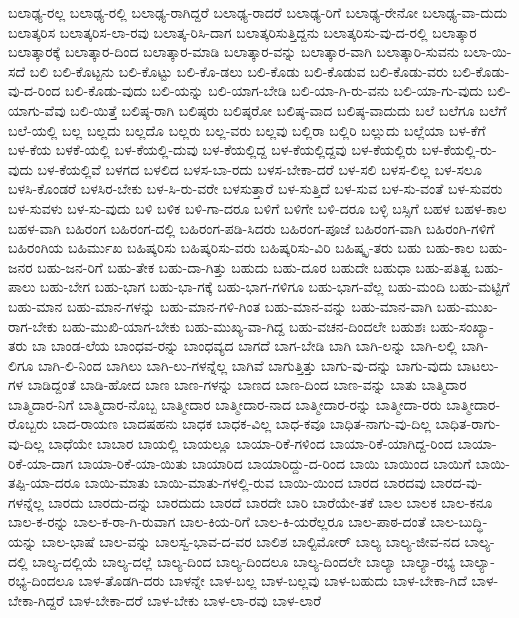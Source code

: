{ಬಲಾಢ್ಯ-ರಲ್ಲ
ಬಲಾಢ್ಯ-ರಲ್ಲಿ
ಬಲಾಢ್ಯ-ರಾಗಿದ್ದರೆ
ಬಲಾಢ್ಯ-ರಾದರೆ
ಬಲಾಢ್ಯ-ರಿಗೆ
ಬಲಾಢ್ಯ-ರೇನೋ
ಬಲಾಢ್ಯ-ವಾ-ದುದು
ಬಲಾತ್ಕರಿಸ
ಬಲಾತ್ಕರಿಸ-ಲಾ-ರವು
ಬಲಾತ್ಕ-ರಿಸಿ-ದಾಗ
ಬಲಾತ್ಕರಿಸುತ್ತಿದ್ದನು
ಬಲಾತ್ಕರಿಸು-ವು-ದ-ರಲ್ಲಿ
ಬಲಾತ್ಕಾರ
ಬಲಾತ್ಕಾರಕ್ಕೆ
ಬಲಾತ್ಕಾರ-ದಿಂದ
ಬಲಾತ್ಕಾರ-ಮಾಡಿ
ಬಲಾತ್ಕಾರ-ವನ್ನು
ಬಲಾತ್ಕಾರ-ವಾಗಿ
ಬಲಾತ್ಕಾರಿ-ಸುವನು
ಬಲಾ-ಯಿ-ಸದೆ
ಬಲಿ
ಬಲಿ-ಕೊಟ್ಟನು
ಬಲಿ-ಕೊಟ್ಟು
ಬಲಿ-ಕೊ-ಡಲು
ಬಲಿ-ಕೊಡು
ಬಲಿ-ಕೊಡುವ
ಬಲಿ-ಕೊಡು-ವರು
ಬಲಿ-ಕೊಡು-ವು-ದ-ರಿಂದ
ಬಲಿ-ಕೊಡು-ವುದು
ಬಲಿ-ಯನ್ನು
ಬಲಿ-ಯಾಗ-ಬೇಡಿ
ಬಲಿ-ಯಾ-ಗಿ-ರು-ವನು
ಬಲಿ-ಯಾ-ಗು-ವುದು
ಬಲಿ-ಯಾಗು-ವೆವು
ಬಲಿ-ಯಿತ್ತೆ
ಬಲಿಷ್ಠ-ರಾಗಿ
ಬಲಿಷ್ಠರು
ಬಲಿಷ್ಠರೋ
ಬಲಿಷ್ಠ-ವಾದ
ಬಲಿಷ್ಠ-ವಾದುದು
ಬಲೆ
ಬಲೆಗೂ
ಬಲೆಗೆ
ಬಲೆ-ಯಲ್ಲಿ
ಬಲ್ಲ
ಬಲ್ಲದು
ಬಲ್ಲದೊ
ಬಲ್ಲರು
ಬಲ್ಲ-ವರು
ಬಲ್ಲವು
ಬಲ್ಲಿರಾ
ಬಲ್ಲಿರಿ
ಬಲ್ಲುದು
ಬಲ್ಲೆಯಾ
ಬಳ-ಕೆಗೆ
ಬಳ-ಕೆಯ
ಬಳಕೆ-ಯಲ್ಲಿ
ಬಳ-ಕೆಯಲ್ಲಿ-ದುವು
ಬಳ-ಕೆಯಲ್ಲಿದ್ದ
ಬಳ-ಕೆಯಲ್ಲಿದ್ದವು
ಬಳ-ಕೆಯಲ್ಲಿರು
ಬಳ-ಕೆಯಲ್ಲಿ-ರು-ವುದು
ಬಳ-ಕೆಯಲ್ಲಿವೆ
ಬಳಗದ
ಬಳಲಿದ
ಬಳಸ-ಬಾ-ರದು
ಬಳಸ-ಬೇಕಾ-ದರೆ
ಬಳ-ಸಲಿ
ಬಳಸ-ಲಿಲ್ಲ
ಬಳ-ಸಲೂ
ಬಳಸಿ-ಕೊಂಡರೆ
ಬಳಸಿರ-ಬೇಕು
ಬಳ-ಸಿ-ರು-ವರೇ
ಬಳಸುತ್ತಾರೆ
ಬಳ-ಸುತ್ತಿದೆ
ಬಳ-ಸುವ
ಬಳ-ಸು-ವಂತೆ
ಬಳ-ಸುವರು
ಬಳ-ಸುವಳು
ಬಳ-ಸು-ವುದು
ಬಳಿ
ಬಳಿಕ
ಬಳಿ-ಗಾ-ದರೂ
ಬಳಿಗೆ
ಬಳಿಗೇ
ಬಳಿ-ದರೂ
ಬಳ್ಳಿ
ಬಸ್ಸಿಗೆ
ಬಹಳ
ಬಹಳ-ಕಾಲ
ಬಹಳ-ವಾಗಿ
ಬಹಿರಂಗ
ಬಹಿರಂಗ-ದಲ್ಲಿ
ಬಹಿರಂಗ-ಪಡಿ-ಸಿದರು
ಬಹಿರಂಗ-ಪೂಜೆ
ಬಹಿರಂಗ-ವಾಗಿ
ಬಹಿರಂಗಿ-ಗಳಿಗೆ
ಬಹಿರಂಗಿಯ
ಬಹಿರ್ಮುಖ
ಬಹಿಷ್ಕರಿಸು
ಬಹಿಷ್ಕರಿಸು-ವರು
ಬಹಿಷ್ಕರಿಸು-ವಿರಿ
ಬಹಿಷ್ಕೃ-ತರು
ಬಹು
ಬಹು-ಕಾಲ
ಬಹು-ಜನರ
ಬಹು-ಜನ-ರಿಗೆ
ಬಹು-ತೇಕ
ಬಹು-ದಾ-ಗಿತ್ತು
ಬಹುದು
ಬಹು-ದೂರ
ಬಹುದೇ
ಬಹುಧಾ
ಬಹು-ಪತಿತ್ವ
ಬಹು-ಪಾಲು
ಬಹು-ಬೇಗ
ಬಹು-ಭಾಗ
ಬಹು-ಭಾ-ಗಕ್ಕೆ
ಬಹು-ಭಾಗ-ಗಳಿಗೂ
ಬಹು-ಭಾಗ-ವೆಲ್ಲ
ಬಹು-ಮಂದಿ
ಬಹು-ಮಟ್ಟಿಗೆ
ಬಹು-ಮಾನ
ಬಹು-ಮಾನ-ಗಳನ್ನು
ಬಹು-ಮಾನ-ಗಳಿ-ಗಿಂತ
ಬಹು-ಮಾನ-ವನ್ನು
ಬಹು-ಮಾನ-ವಾಗಿ
ಬಹು-ಮುಖ-ರಾಗ-ಬೇಕು
ಬಹು-ಮುಖಿ-ಯಾಗ-ಬೇಕು
ಬಹು-ಮುಖ್ಯ-ವಾ-ಗಿದ್ದ
ಬಹು-ವಚನ-ದಿಂದಲೇ
ಬಹುಶಃ
ಬಹು-ಸಂಖ್ಯಾ-ತರು
ಬಾ
ಬಾಂಡ-ಲೆಯ
ಬಾಂಧವ-ರನ್ನು
ಬಾಂಧವ್ಯದ
ಬಾಗದೆ
ಬಾಗ-ಬೇಡಿ
ಬಾಗಿ
ಬಾಗಿ-ಲನ್ನು
ಬಾಗಿ-ಲಲ್ಲಿ
ಬಾಗಿ-ಲಿಗೂ
ಬಾಗಿ-ಲಿ-ನಿಂದ
ಬಾಗಿಲು
ಬಾಗಿ-ಲು-ಗಳನ್ನೆಲ್ಲ
ಬಾಗಿವೆ
ಬಾಗುತ್ತಿತ್ತು
ಬಾಗು-ವು-ದನ್ನು
ಬಾಗು-ವುದು
ಬಾಟಲು-ಗಳ
ಬಾಡಿದ್ದಂತೆ
ಬಾಡಿ-ಹೋದ
ಬಾಣ
ಬಾಣ-ಗಳನ್ನು
ಬಾಣದ
ಬಾಣ-ದಿಂದ
ಬಾಣ-ವನ್ನು
ಬಾತು
ಬಾತ್ಮಿದಾರ
ಬಾತ್ಮಿದಾರ-ನಿಗೆ
ಬಾತ್ಮಿದಾರ-ನೊಬ್ಬ
ಬಾತ್ಮೀದಾರ
ಬಾತ್ಮೀದಾರ-ನಾದ
ಬಾತ್ಮೀದಾರ-ರನ್ನು
ಬಾತ್ಮೀದಾ-ರರು
ಬಾತ್ಮೀದಾರ-ರೊಬ್ಬರು
ಬಾದ-ರಾಯಣ
ಬಾದಷಹನು
ಬಾಧಕ
ಬಾಧಕ-ವಿಲ್ಲ
ಬಾಧ-ಕವೂ
ಬಾಧಿತ-ನಾಗು-ವು-ದಿಲ್ಲ
ಬಾಧಿತ-ರಾಗು-ವು-ದಿಲ್ಲ
ಬಾಧೆಯೇ
ಬಾಬಾರ
ಬಾಯಲ್ಲಿ
ಬಾಯಲ್ಲೂ
ಬಾಯಾ-ರಿಕೆ-ಗಳಿಂದ
ಬಾಯಾ-ರಿಕೆ-ಯಾಗಿದ್ದ-ರಿಂದ
ಬಾಯಾ-ರಿಕೆ-ಯಾ-ದಾಗ
ಬಾಯಾ-ರಿಕೆ-ಯಾ-ಯಿತು
ಬಾಯಾರಿದ
ಬಾಯಾರಿದ್ದು-ದ-ರಿಂದ
ಬಾಯಿ
ಬಾಯಿಂದ
ಬಾಯಿಗೆ
ಬಾಯಿ-ತಪ್ಪಿ-ಯಾ-ದರೂ
ಬಾಯಿ-ಮಾತು
ಬಾಯಿ-ಮಾತು-ಗಳಲ್ಲಿ-ರುವ
ಬಾಯಿ-ಯಿಂದ
ಬಾರದ
ಬಾರದವು
ಬಾರದ-ವು-ಗಳನ್ನೆಲ್ಲ
ಬಾರದು
ಬಾರದು-ದನ್ನು
ಬಾರದುದು
ಬಾರದೆ
ಬಾರದೇ
ಬಾರಿ
ಬಾರೆಯೇ-ತಕೆ
ಬಾಲ
ಬಾಲಕ
ಬಾಲ-ಕನೂ
ಬಾಲ-ಕ-ರನ್ನು
ಬಾಲ-ಕ-ರಾ-ಗಿ-ರುವಾಗ
ಬಾಲ-ಕಿಯ-ರಿಗೆ
ಬಾಲ-ಕಿ-ಯರೆಲ್ಲರೂ
ಬಾಲ-ಪಾಠ-ದಂತೆ
ಬಾಲ-ಬುದ್ಧಿ-ಯನ್ನು
ಬಾಲ-ಭಾಷೆ
ಬಾಲ-ವನ್ನು
ಬಾಲಸ್ವ-ಭಾವ-ದ-ವರ
ಬಾಲಿಶ
ಬಾಲ್ಟಿಮೋರ್
ಬಾಲ್ಯ
ಬಾಲ್ಯ-ಜೀವ-ನದ
ಬಾಲ್ಯ-ದಲ್ಲಿ
ಬಾಲ್ಯ-ದಲ್ಲಿಯೆ
ಬಾಲ್ಯ-ದಲ್ಲೆ
ಬಾಲ್ಯ-ದಿಂದ
ಬಾಲ್ಯ-ದಿಂದಲೂ
ಬಾಲ್ಯ-ದಿಂದಲೇ
ಬಾಲ್ಯಾ
ಬಾಲ್ಯಾ-ರಭ್ಯ
ಬಾಲ್ಯಾ-ರಭ್ಯ-ದಿಂದಲೂ
ಬಾಳ-ತೊಡಗಿ-ದರು
ಬಾಳನ್ನೇ
ಬಾಳ-ಬಲ್ಲ
ಬಾಳ-ಬಲ್ಲವು
ಬಾಳ-ಬಹುದು
ಬಾಳ-ಬೇಕಾ-ಗಿದೆ
ಬಾಳ-ಬೇಕಾ-ಗಿದ್ದರೆ
ಬಾಳ-ಬೇಕಾ-ದರೆ
ಬಾಳ-ಬೇಕು
ಬಾಳ-ಲಾ-ರವು
ಬಾಳ-ಲಾರೆ
}
